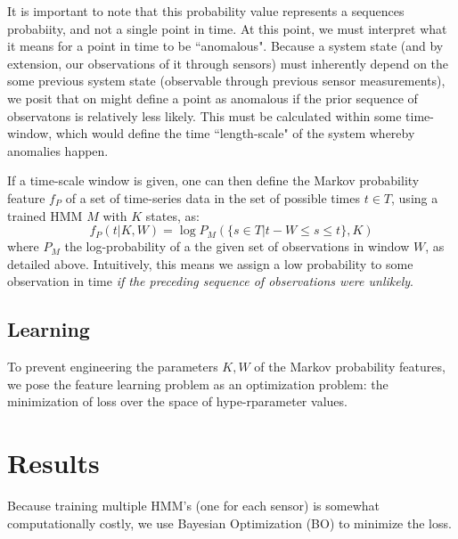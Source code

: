 \documentclass[twocolumn,10pt]{article}
\begin{document}
It is important to note that this probability value represents a sequences probabiity, and not a single point in time. At this point, we must interpret what it means for a point in time to be ``anomalous". Because a system state (and by extension, our observations of it through sensors) must inherently depend on the some previous system state (observable through previous sensor measurements), we posit that on might define a point as anomalous if the prior sequence of observatons is relatively less likely. This must be calculated within some time-window, which would define the time ``length-scale" of the system whereby anomalies happen. 

If a time-scale window is given, one can then define the Markov probability feature $f_P$ of a set of time-series data in the set of possible times $t\in T$, using a trained HMM $M$ with $K$ states, as: 
\begin{equation}
    f_P(t|K, W) = \log P_M(\{s\in T | t-W \leq s\leq t \}, K)
\end{equation} 
where $P_M$ the log-probability of a the given set of observations in window  $W$, as detailed above. Intuitively, this means we assign a low probability to some observation in time \textit{if the preceding sequence of observations were unlikely}. 


\subsection{Learning}

To prevent engineering the parameters $K, W$ of the Markov probability features, we pose the feature learning problem as an optimization problem: the minimization of loss over the space of hype-rparameter values. 

\section{Results}
Because training multiple HMM's (one for each sensor) is somewhat computationally costly, we use Bayesian Optimization (BO) to minimize the loss. 
\end{document}
